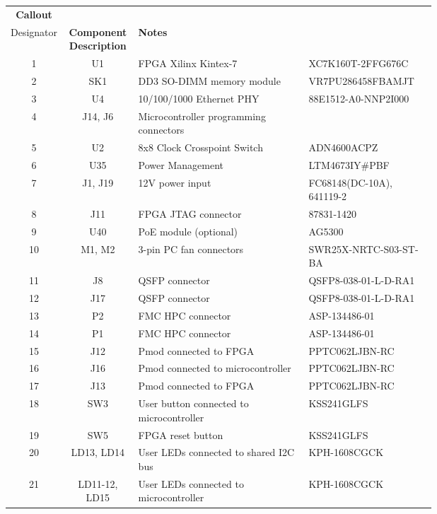 \documentclass[12pt,oneside,a4]{article}
\begin{document}
\begin{longtable}[htbp]{@{}ccp{0.4\linewidth}p{0.3\linewidth}}
\toprule
\textbf{Callout} &
  \textbf{\begin{tabular}[c]{@{}c@{}}Reference\\ Designator\end{tabular}} &
  \textbf{Component Description} &
  \textbf{Notes} \\ \midrule
1  & U1  & FPGA Xilinx Kintex-7      & XC7K160T-2FFG676C \\
2  & SK1 & DD3 SO-DIMM memory module & VR7PU286458FBAMJT \\
3  & U4  & 10/100/1000 Ethernet PHY  & 88E1512-A0-NNP2I000  \\
4  & J14, J6 & Microcontroller programming connectors         &  \\
5  & U2  & 8x8 Clock Crosspoint Switch   & ADN4600ACPZ     \\
6  & U35 & Power Management          & LTM4673IY\#PBF   \\
7  & J1, J19 & 12V power input       & FC68148(DC-10A), 641119-2  \\
8  & J11 & FPGA JTAG connector       & 87831-1420   \\
9  & U40 & PoE module (optional)     & AG5300          \\
10 & M1, M2 & 3-pin PC fan connectors & SWR25X-NRTC-S03-ST-BA \\
11 & J8  & QSFP connector            & QSFP8-038-01-L-D-RA1 \\
12 & J17 & QSFP connector            & QSFP8-038-01-L-D-RA1   \\
13 & P2  & FMC HPC connector         & ASP-134486-01 \\
14 & P1  & FMC HPC connector         & ASP-134486-01     \\
15 & J12 & Pmod connected to FPGA    & PPTC062LJBN-RC     \\
16 & J16 & Pmod connected to microcontroller  & PPTC062LJBN-RC    \\
17 & J13 & Pmod connected to FPGA    & PPTC062LJBN-RC    \\
18 & SW3 & User button connected to microcontroller      &  KSS241GLFS  \\
19 & SW5 & FPGA reset button         & KSS241GLFS      \\
20 & LD13, LD14 & User LEDs connected to shared I2C bus & KPH-1608CGCK \\
21 & LD11-12, LD15 & User LEDs connected to microcontroller &  KPH-1608CGCK  \\

\end{longtable}
\end{document}
